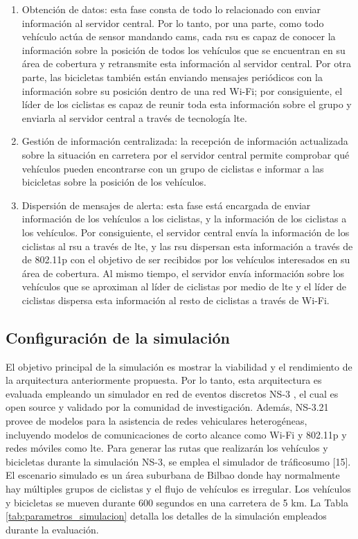 \begin{enumerate}
	\item Obtención de datos: esta fase consta de todo lo relacionado con enviar
	información al servidor central. Por lo tanto, por una parte, como todo
	vehículo actúa de sensor mandando \gls{cam}s, cada \gls{rsu} es capaz de
	conocer la información sobre la posición de todos los vehículos que se
	encuentran en su área de cobertura y retransmite esta información al
	servidor central. Por otra parte, las bicicletas también están enviando
	mensajes periódicos con la información sobre su posición dentro de una red
	Wi-Fi; por consiguiente, el líder de los ciclistas es capaz de reunir toda
	esta información sobre el grupo y enviarla al servidor central a través de
	tecnología \gls{lte}.

	\item Gestión de información centralizada: la recepción de información
	actualizada sobre la situación en carretera por el servidor central permite
	comprobar qué vehículos pueden encontrarse con un grupo de ciclistas e
	informar a las bicicletas sobre la posición de los vehículos.

	\item Dispersión de mensajes de alerta: esta fase está encargada de enviar
	información de los vehículos a los ciclistas, y la información de los
	ciclistas a los vehículos. Por consiguiente, el servidor central envía la
	información de los ciclistas al \gls{rsu} a través de \gls{lte}, y las
	\gls{rsu} dispersan esta información a través de de \gls{802.11p} con el
	objetivo de ser recibidos por los vehículos interesados en su área de
	cobertura. Al mismo tiempo, el servidor envía información sobre los vehículos
	que se aproximan al líder de ciclistas por medio de \gls{lte} y el líder de
	ciclistas dispersa esta información al resto de ciclistas a través de Wi-Fi.
\end{enumerate}

\subsection{Configuración de la simulación}
El objetivo principal de la simulación es mostrar la viabilidad y el
rendimiento de la arquitectura anteriormente propuesta. Por lo tanto, esta
arquitectura es evaluada empleando un simulador en red de eventos discretos
NS-3 \cite{14}, el cual es open source y validado por la comunidad de
investigación. Además, NS-3.21 provee de modelos para la asistencia de redes
vehiculares heterogéneas, incluyendo modelos de comunicaciones de corto alcance
como Wi-Fi y \gls{802.11p} y redes móviles como \gls{lte}. Para generar las
rutas que realizarán los vehículos y bicicletas durante la simulación NS-3,
se emplea el simulador de tráfico\gls{sumo} [15]. El escenario simulado es un
área suburbana de Bilbao donde hay normalmente hay múltiples grupos de
ciclistas y el flujo de vehículos es irregular. Los vehículos y bicicletas se
mueven durante 600 segundos en una carretera de 5 km. La Tabla
\ref{tab:parametros_simulacion} detalla los detalles de la simulación empleados
durante la evaluación.

